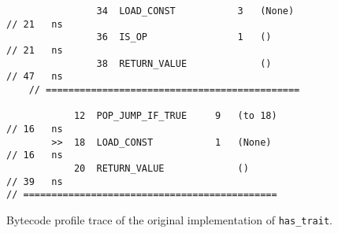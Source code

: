 \begin{code}
\begin{verbatim}
                34  LOAD_CONST           3   (None)                                                 // 21   ns
                36  IS_OP                1   ()                                                     // 21   ns
                38  RETURN_VALUE             ()                                                     // 47   ns
    // =============================================

            12  POP_JUMP_IF_TRUE     9   (to 18)                                                    // 16   ns
        >>  18  LOAD_CONST           1   (None)                                                     // 16   ns
            20  RETURN_VALUE             ()                                                         // 39   ns
// =============================================
    \end{verbatim}
    \caption{Bytecode profile trace of the original implementation of \texttt{has_trait}.}
    \label{listing:bytecode-profiles-hastrait-original}
\end{code}

\vspace{2em}


